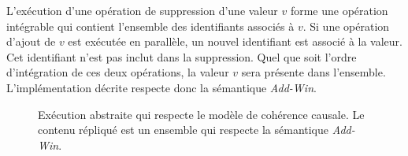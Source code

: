 L'exécution d'une opération de suppression d'une valeur $v$ forme une opération intégrable qui contient l'ensemble des identifiants associés à $v$.
Si une opération d'ajout de $v$ est exécutée en parallèle, un nouvel identifiant est associé à la valeur.
Cet identifiant n'est pas inclut dans la suppression.
Quel que soit l'ordre d'intégration de ces deux opérations, la valeur $v$ sera présente dans l'ensemble.
L'implémentation décrite respecte donc la sémantique \emph{Add-Win}.

\begin{figure}[bth]
\centering
{}
\caption{Exécution abstraite qui respecte le modèle de cohérence causale.
Le contenu répliqué est un ensemble qui respecte la sémantique \emph{Add-Win}.}\label{fig:awset-example}
\end{figure}

